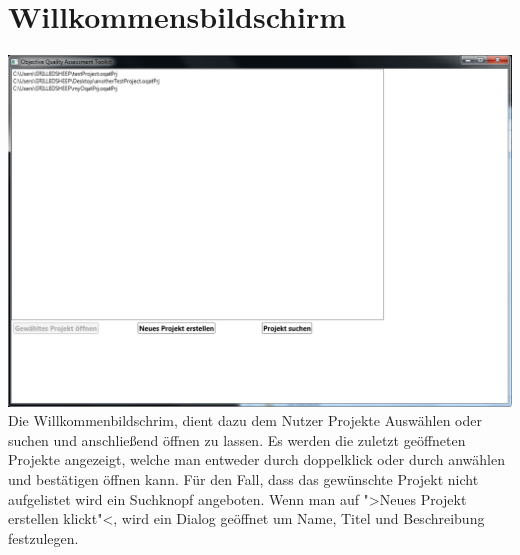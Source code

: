 \chapter{Willkommensbildschirm}
\includegraphics[scale=0.55]{bilder/Welcome.png}\\[5ex]


Die Willkommenbildschrim, dient dazu dem Nutzer Projekte  Auswählen oder suchen und anschließend öffnen zu lassen. Es werden die zuletzt geöffneten Projekte angezeigt, welche man entweder durch doppelklick oder durch anwählen und bestätigen öffnen kann. Für den Fall, dass das gewünschte Projekt nicht aufgelistet wird ein Suchknopf angeboten. Wenn man auf ">Neues Projekt erstellen klickt"<, wird ein Dialog geöffnet um Name, Titel und Beschreibung festzulegen.